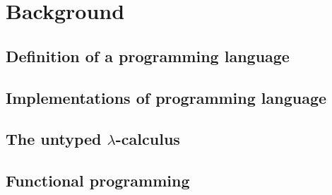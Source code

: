 \section{Background}
\label{sec:background}

\subsection{Definition of a programming language}
\label{sec:pl-definition}



\subsection{Implementations of programming language}
\label{sec:pl-implementation}


\subsection{The untyped $\lambda$-calculus}
\label{sec:ulc}

\subsection{Functional programming}
\label{sec:fp}


